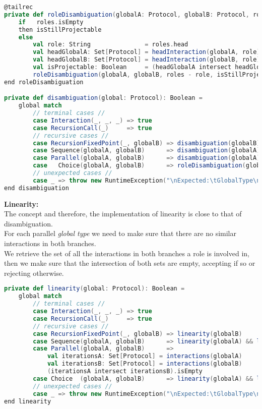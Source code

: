\begin{lstlisting}[language=Scala, caption=Disambiguation]
@tailrec
private def roleDisambiguation(globalA: Protocol, globalB: Protocol, roles: Set[String], isStillProjectable: Boolean): Boolean =
    if   roles.isEmpty
    then isStillProjectable
    else
        val role: String               = roles.head
        val headGlobalA: Set[Protocol] = headInteraction(globalA, role)
        val headGlobalB: Set[Protocol] = headInteraction(globalB, role)
        val isProjectable: Boolean     = (headGlobalA intersect headGlobalB).isEmpty
        roleDisambiguation(globalA, globalB, roles - role, isStillProjectable && isProjectable)
end roleDisambiguation

private def disambiguation(global: Protocol): Boolean =
    global match
        // terminal cases //
        case Interaction(_, _, _) => true
        case RecursionCall(_)     => true
        // recursive cases //
        case RecursionFixedPoint(_, globalB) => disambiguation(globalB)
        case Sequence(globalA, globalB)      => disambiguation(globalA) && disambiguation(globalB)
        case Parallel(globalA, globalB)      => disambiguation(globalA) && disambiguation(globalB)
        case   Choice(globalA, globalB)      => roleDisambiguation(globalA, globalB, roles(global), true)
        // unexpected cases //
        case _ => throw new RuntimeException("\nExpected:\tGlobalType\nFound:\t\tLocalType")
end disambiguation
\end{lstlisting}
\textbf{Linearity:}\\
The concept and therefore, the implementation of linearity is close to that of disambiguation.\\
For each parallel \textit{global type} we need to make sure that there are no similar interactions in both branches. \cite{cledou2022api}\\
We retrieve the set of all the interactions in both branches a role is involved in, then we  make sure that the intersection of both sets are empty, accepting if so or rejecting otherwise.\\
\begin{lstlisting}[language=Scala, caption=Linearity]
private def linearity(global: Protocol): Boolean =
    global match
        // terminal cases //
        case Interaction(_, _, _) => true
        case RecursionCall(_)     => true
        // recursive cases //
        case RecursionFixedPoint(_, globalB) => linearity(globalB)
        case Sequence(globalA, globalB)      => linearity(globalA) && linearity(globalB)
        case Parallel(globalA, globalB)      =>
            val iterationsA: Set[Protocol] = interactions(globalA)
            val iterationsB: Set[Protocol] = interactions(globalB)
            (iterationsA intersect iterationsB).isEmpty
        case Choice  (globalA, globalB)      => linearity(globalA) && linearity(globalB)
        // unexpected cases //
        case _ => throw new RuntimeException("\nExpected:\tGlobalType\nFound:\t\tLocalType")
end linearity    
\end{lstlisting}
